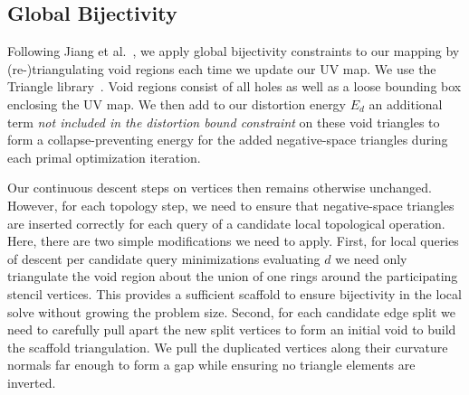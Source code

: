 %

\subsection{Global Bijectivity}
\label{sec:bijectivity}

Following Jiang et al.\ , we apply global bijectivity constraints to our mapping by (re-)triangulating void regions each time we update our UV map. We use the Triangle library~\cite{shewchuk1996triangle}. Void regions consist of all holes as well as a loose bounding box enclosing the UV map.
We then add to our distortion energy $E_d$ an additional term \emph{not included in the distortion bound constraint} on these void triangles to form a collapse-preventing energy for the added negative-space triangles during each primal optimization iteration.

Our continuous descent steps on vertices then remains otherwise unchanged.
However, for each topology step, we need to ensure that negative-space triangles are inserted correctly for each query of a candidate local topological operation. Here, there are two simple modifications we need to apply. First, for local queries of descent per candidate query minimizations evaluating $d$ we need only triangulate the void region about the union of one rings around the participating stencil vertices. This provides a sufficient scaffold to ensure bijectivity in the local solve without growing the problem size. Second, for each candidate edge split we need to carefully pull apart the new split vertices to form an initial void to build the scaffold triangulation. We pull the duplicated vertices along their curvature normals far enough to form a gap while ensuring no triangle elements are inverted. 

